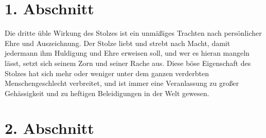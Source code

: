 \newpage


\section{1. Abschnitt} \label{kap9_ab1}

Die dritte üble Wirkung des Stolzes ist ein unmäßiges Trachten nach
persönlicher
Ehre und Auszeichnung. Der Stolze liebt und
strebt nach Macht, damit jedermann
ihm Huldigung und Ehre erweisen soll, und wer es hieran mangeln lässt, setzt
sich seinem Zorn und seiner Rache aus. Diese böse
Eigenschaft des Stolzes hat
sich mehr oder weniger unter dem ganzen verderbten Menschengeschlecht
verbreitet, und ist immer eine Veranlassung zu großer
Gehässigkeit und zu
heftigen Beleidigungen in der Welt gewesen.

\section{2. Abschnitt} \label{kap9_ab2}

